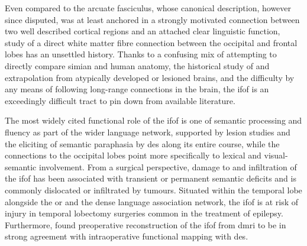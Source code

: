 Even compared to the arcuate fasciculus, whose canonical description, however since disputed, was at least anchored in a strongly motivated connection between two well described cortical regions and an attached clear linguistic function, study of a direct white matter fibre connection between the occipital and frontal lobes has an unsettled history.\autocite{Forkel2014a}
Thanks to a confusing mix of attempting to directly compare simian and human anatomy,\autocite{Schmahmann2007,ThiebautdeSchotten2012,Mandonnet2018,Sarubbo2019} the historical study of and extrapolation from atypically developed or lesioned brains,\autocite{Schmahmann2007,Forkel2014a} and the difficulty by any means of following long-range connections in the brain,
\autocite{Martino2010} the \gls{ifof} is an exceedingly difficult tract to pin down from available literature.\autocite{Sarubbo2019,Weiller2021}

The most widely cited functional role of the \gls{ifof} is one of semantic processing and fluency as part of the wider language network, supported by lesion studies\autocite{Ille2018b,Almairac2015} and the eliciting of semantic paraphasia by \gls{des} along its entire course,\autocite{Duffau2013a,Herbet2017,Voets2017} while the connections to the occipital lobes point more specifically to lexical and visual-semantic involvement.
\autocite{Martino2010,Rollans2017,Rollans2018}
From a surgical perspective, damage to and infiltration of the \gls{ifof} has been associated with transient or permanent semantic deficits and is commonly dislocated or infiltrated by tumours. \autocite{Almairac2015,Voets2017,Altieri2019,Binding2023}
Situated within the temporal lobe alongside the \gls{or} and the dense language association network, the \gls{ifof} is at risk of injury in temporal lobectomy surgeries common in the treatment of epilepsy. \autocite{Baran2020,Shah2022,Binding2023}
Furthermore, \textcite{Bello2010d} found preoperative reconstruction of the \gls{ifof} from \gls{dmri} to be in strong agreement with intraoperative functional mapping with \gls{des}.

